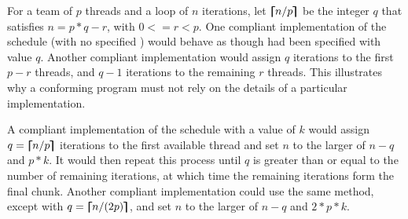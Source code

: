 \linenumbers
\bigskip\bigskip


\begin{note}
For a team of $p$ threads and a loop of $n$ iterations, let $\bm{\lceil\mkern-10mu\lceil} n/p \bm{\rceil\mkern-10mu\rceil}$ 
be the integer $q$ that satisfies $n = p*q - r$, with $0 <= r < p$. One compliant 
implementation of the  schedule (with no specified ) 
would behave as though  had been specified with value $q$. Another 
compliant implementation would assign $q$ iterations to the first $p-r$ threads, 
and $q-1$ iterations to the remaining $r$ threads. This illustrates why a
conforming program must not rely on the details of a particular implementation.

A compliant implementation of the  schedule with a  
value of $k$ would assign $q = \bm{\lceil\mkern-10mu\lceil} n/p \bm{\rceil\mkern-10mu\rceil}$ iterations to the first 
available thread and set $n$ to the larger of $n-q$ and $p*k$. It would then 
repeat this process until $q$ is greater than or equal to the number of remaining 
iterations, at which time the remaining iterations form the final
chunk. Another compliant implementation could use the same method, except with
$q = \bm{\lceil\mkern-10mu\lceil} n/(2p) \bm{\rceil\mkern-10mu\rceil}$, and set $n$ to the larger of $n-q$ and $2*p*k$.
\end{note}


\nolinenumbers

